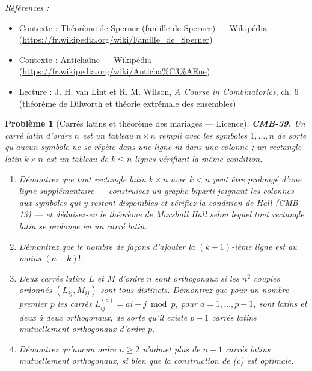 \documentclass[11pt]{article}
\newtheorem{problem}{Problème}
\newenvironment{refs}{\par\small\noindent\emph{Références :}\begin{itemize}\setlength\itemsep{0pt}}{\end{itemize}\normalsize}
\begin{document}
\begin{refs}
\item Contexte : Théorème de Sperner (famille de Sperner) --- Wikipédia (\url{https://fr.wikipedia.org/wiki/Famille_de_Sperner})
\item Contexte : Antichaîne --- Wikipédia (\url{https://fr.wikipedia.org/wiki/Anticha%C3%AEne})
\item Lecture : J. H. van Lint et R. M. Wilson, \textit{A Course in Combinatorics}, ch. 6 (théorème de Dilworth et théorie extrémale des ensembles)
\end{refs}

\bigskip

\begin{problem}[{Carrés latins et théorème des mariages --- Licence}]
\textbf{CMB-39.} Un carré latin d'ordre $ n $ est un tableau $ n \times n $ rempli avec les symboles $ 1, \dots, n $ de sorte qu'aucun symbole ne se répète dans une ligne ni dans une colonne ; un rectangle latin $ k \times n $ est un tableau de $ k \le n $ lignes vérifiant la même condition.
\begin{enumerate}
\item[(a)] Démontrez que tout rectangle latin $ k \times n $ avec $ k < n $ peut être prolongé d'une ligne supplémentaire --- construisez un graphe biparti joignant les colonnes aux symboles qui y restent disponibles et vérifiez la condition de Hall (CMB-13) --- et déduisez-en le théorème de Marshall Hall selon lequel tout rectangle latin se prolonge en un carré latin.
\item[(b)] Démontrez que le nombre de façons d'ajouter la $ (k+1) $-ième ligne est au moins $ (n-k)! $.
\item[(c)] Deux carrés latins $ L $ et $ M $ d'ordre $ n $ sont \textit{orthogonaux} si les $ n^2 $ couples ordonnés $ (L_{ij}, M_{ij}) $ sont tous distincts. Démontrez que pour un nombre premier $ p $ les carrés $ L^{(a)}_{ij} = a i + j \bmod p $, pour $ a = 1, \dots, p-1 $, sont latins et deux à deux orthogonaux, de sorte qu'il existe $ p-1 $ carrés latins mutuellement orthogonaux d'ordre $ p $.
\item[(d)] Démontrez qu'aucun ordre $ n \ge 2 $ n'admet plus de $ n-1 $ carrés latins mutuellement orthogonaux, si bien que la construction de (c) est optimale.
\end{enumerate}

\end{problem}
\end{document}

